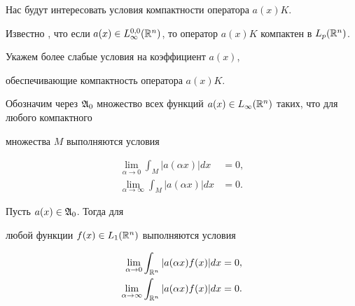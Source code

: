 Нас будут интересовать условия компактности оператора $a(x)K$.


Известно \cite{b2}, что если $a(x)\in L_\infty^{0,


0}(\Bbb R^n)$, то оператор $a(x)K$ компактен в $L_p(\Bbb R^n)$.


Укажем более слабые условия на коэффициент $a(x)$,


обеспечивающие компактность оператора $a(x)K$.





Обозначим через $\frak A_0$ множество всех функций $a(x)\in


L_\infty(\Bbb R^n)$ таких, что для любого компактного


множества $M$ выполняются условия


\begin{align}


\lim_{\alpha\to 0}\int_M |a(\alpha x)|dx&=0,\label{2.2}\\


\lim_{\alpha\to \infty}\int_M |a(\alpha x)|dx&=0.


\label{2.3}


\end{align}





\begin{lem}\label{l2.1}


Пусть $a(x)\in\frak A_0$. Тогда для


любой функции $f(x)\in L_1(\Bbb R^n)$ выполняются условия


\begin{align}


\lim_{\alpha\to 0}\int_{\Bbb R^n} |a(\alpha x)f(x)|dx&=0,


\label{2.4}\\


\lim_{\alpha\to \infty}\int_{\Bbb R^n} |a(\alpha x)f(x)|


dx&=0.\label{2.5}


\end{align}


\end{lem}





